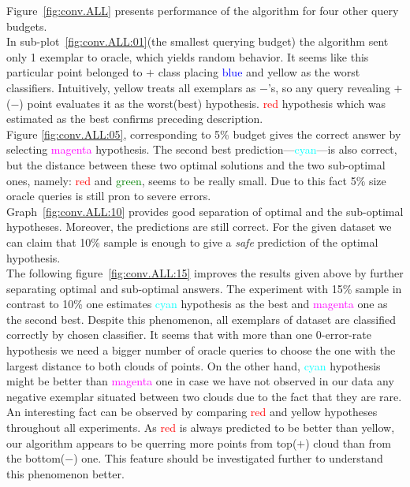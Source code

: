 \documentclass[12pt, a4paper, pdflatex, leqno, twoside]{report}
\begin{document}
Figure~\ref{fig:conv.ALL} presents performance of the algorithm for four other query budgets.\\ 
In sub-plot~\ref{fig:conv.ALL:01}(the smallest querying 
budget) the algorithm sent only 1 exemplar to oracle, which yields random 
behavior. It seems like this particular point belonged to $+$ class placing 
\textcolor{blue}{blue} and \textcolor{Dandelion}{yellow} as the worst 
classifiers. Intuitively, \textcolor{Dandelion}{yellow} treats all exemplars 
as $-$'s, so any query revealing $+$($-$) point evaluates it as the worst(best) hypothesis. \textcolor{red}{red} hypothesis which was estimated as the best confirms preceding description. \\
Figure \ref{fig:conv.ALL:05}, corresponding to 5\% budget gives the correct 
answer by selecting \textcolor{magenta}{magenta} hypothesis. The second best 
prediction---\textcolor{cyan}{cyan}---is also correct, but the distance between 
these two optimal solutions and the two sub-optimal ones, namely: \textcolor{red}{red} 
and \textcolor{green}{green}, seems to be really small. Due to this fact 5\% 
size oracle queries is still pron to severe errors.\\
Graph~\ref{fig:conv.ALL:10} provides good separation of optimal and the sub-optimal 
hypotheses. Moreover, the predictions are still correct. For the given dataset we 
can claim that 10\% sample is enough to give a \emph{safe} prediction of the 
optimal hypothesis.\\
The following figure~\ref{fig:conv.ALL:15} improves the results given above by 
further separating optimal and sub-optimal answers. The experiment with 15\% sample 
in contrast to 10\% one estimates \textcolor{cyan}{cyan} hypothesis as the best 
and \textcolor{magenta}{magenta} one as the second best. Despite this 
phenomenon, all exemplars of dataset are classified correctly by chosen 
classifier. It seems that with more than one 0-error-rate hypothesis we need 
a bigger number of oracle queries to choose the one with the largest distance to both 
clouds of points. On the other hand, \textcolor{cyan}{cyan} hypothesis might be 
better than \textcolor{magenta}{magenta} one in case we have not observed in 
our data any negative exemplar situated between two clouds due to the fact that 
they are rare.\\

An interesting fact can be observed by comparing \textcolor{red}{red} and 
\textcolor{Dandelion}{yellow} hypotheses throughout all experiments. As 
\textcolor{red}{red} is always predicted to be better than 
\textcolor{Dandelion}{yellow}, our algorithm appears to be querring more points 
from top($+$) cloud than from the bottom($-$) one. This feature should be 
investigated further to understand this phenomenon better.\\
\end{document}
